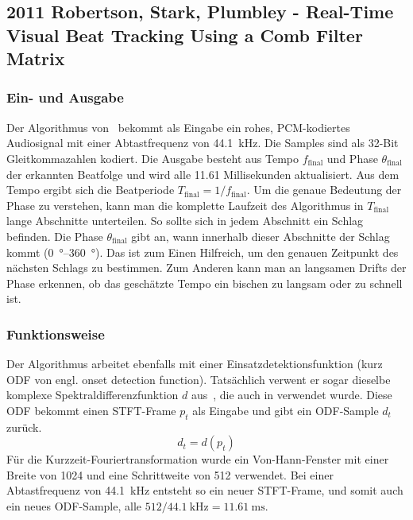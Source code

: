 {	\subsection{2011 Robertson, Stark, Plumbley - Real-Time Visual Beat Tracking Using a Comb Filter Matrix}
	{
		\subsubsection*{Ein- und Ausgabe}
		{
			Der Algorithmus von~\cite{2011_PlRoSt} bekommt als Eingabe ein rohes, PCM-kodiertes Audiosignal mit einer Abtastfrequenz von \SI{44.1}{\kilo\hertz}.
			Die Samples sind als 32-Bit Gleitkommazahlen kodiert.
			Die Ausgabe besteht aus Tempo $f_\text{final}$ und Phase $\theta_\text{final}$ der erkannten Beatfolge
				und wird alle \num{11.61} Millisekunden aktualisiert.
			Aus dem Tempo ergibt sich die Beatperiode $T_\text{final} = 1 / f_\text{final}$.
			Um die genaue Bedeutung der Phase zu verstehen,
				kann man die komplette Laufzeit des Algorithmus in $T_\text{final}$ lange Abschnitte unterteilen.
			So sollte sich in jedem Abschnitt ein Schlag befinden.
			Die Phase $\theta_\text{final}$ gibt an,
				wann innerhalb dieser Abschnitte der Schlag kommt (\SIrange{0}{360}{\degree}).
			Das ist zum Einen Hilfreich,
				um den genauen Zeitpunkt des nächsten Schlags zu bestimmen.
			Zum Anderen kann man an langsamen Drifts der Phase erkennen,
				ob das geschätzte Tempo ein bischen zu langsam oder zu schnell ist.
		}

		\subsubsection*{Funktionsweise}
		{
			Der Algorithmus  arbeitet ebenfalls mit einer Einsatzdetektionsfunktion (kurz ODF von engl. onset detection function).
			Tatsächlich verwent er sogar dieselbe komplexe Spektraldifferenzfunktion $d$ aus~\cite{2004_BeDaDuSa},
				die auch in \cite{2009_DaPlSt} verwendet wurde.
			Diese ODF bekommt einen STFT-Frame $p_t$ als Eingabe und gibt ein ODF-Sample $d_t$ zurück.
			\begin{equation}
				d_t = d(p_t)
			\end{equation}
			Für die Kurzzeit-Fouriertransformation wurde ein Von-Hann-Fenster mit einer Breite von \num{1024} und eine Schrittweite von \num{512} verwendet.
			Bei einer Abtastfrequenz von \SI{44.1}{\kilo\hertz} entsteht so ein neuer STFT-Frame,
				und somit auch ein neues ODF-Sample,
				alle $512 / \SI{44.1}{\kilo\hertz} = \SI{11.61}{\milli\second}$.

}}}
